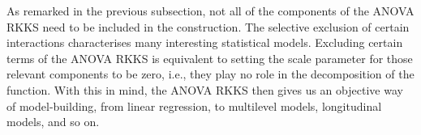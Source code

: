 As remarked in the previous subsection, not all of the components of the ANOVA RKKS need to be included in the construction.
The selective exclusion of certain interactions characterises many interesting statistical models.
Excluding certain terms of the ANOVA RKKS is equivalent to setting the scale parameter for those relevant components to be zero, i.e., they play no role in the decomposition of the function.
With this in mind, the ANOVA RKKS then gives us an objective way of model-building, from linear regression, to multilevel models, longitudinal models, and so on.


